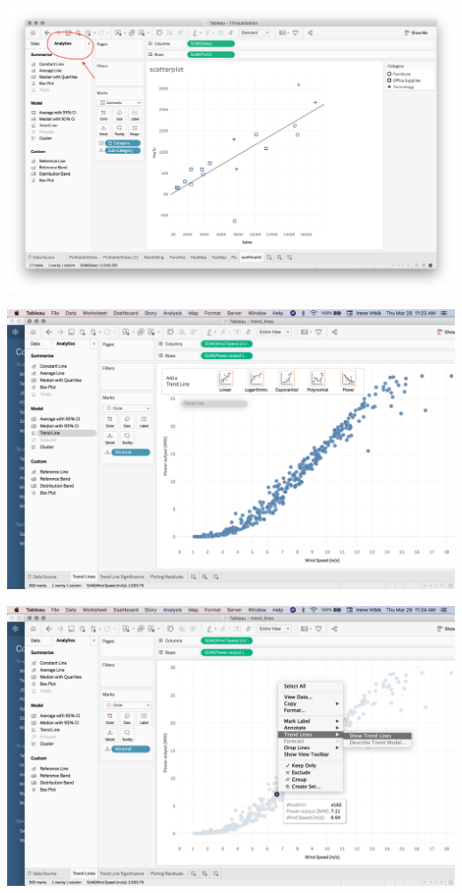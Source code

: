 \documentclass[xcolor=svgnames]{beamer} %
\begin{document}
\begin{frame}
\begin{center}
\includegraphics[width=.9\textwidth]{img/trendlineSP}
\end{center}
\end{frame}


\begin{frame}
\begin{center}
\includegraphics[width=.9\textwidth]{img/dragTrend}
\end{center}
\end{frame}

\begin{frame}
\begin{center}
\includegraphics[width=.9\textwidth]{img/rightClickTrend}
\end{center}
\end{frame}
\end{document}
